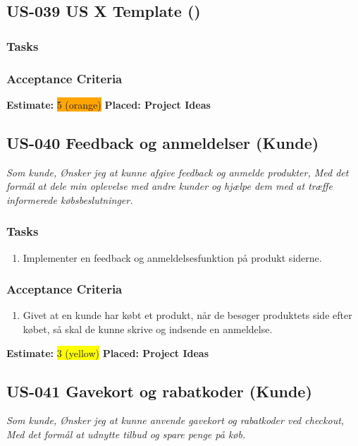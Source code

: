 \subsection{US-039 US X Template ()}
\label{sec:US-039}
\textit{}
\subsubsection*{\textbf{Tasks}}
\begin{enumerate}
\end{enumerate}
\subsubsection*{\textbf{Acceptance Criteria}}
\begin{enumerate}
\end{enumerate}
\textbf{Estimate:} \colorbox{orange}{5 (orange)}
\textbf{Placed: Project Ideas}
\par\noindent\dotfill

\subsection{US-040 Feedback og anmeldelser (Kunde)}
\label{sec:US-040}
\textit{Som kunde, Ønsker jeg at kunne afgive feedback og anmelde produkter, Med det formål at dele min oplevelse med andre kunder og hjælpe dem med at træffe informerede købsbeslutninger.}
\subsubsection*{\textbf{Tasks}}
\begin{enumerate}
  \item Implementer en feedback og anmeldelsesfunktion på produkt siderne.
\end{enumerate}
\subsubsection*{\textbf{Acceptance Criteria}}
\begin{enumerate}
  \item Givet at en kunde har købt et produkt, når de besøger produktets side efter købet, så skal de kunne skrive og indsende en anmeldelse.
\end{enumerate}
\textbf{Estimate:} \colorbox{yellow}{3 (yellow)}
\textbf{Placed: Project Ideas}
\par\noindent\dotfill

\subsection{US-041 Gavekort og rabatkoder (Kunde)}
\label{sec:US-041}
\textit{Som kunde, Ønsker jeg at kunne anvende gavekort og rabatkoder ved checkout, Med det formål at udnytte tilbud og spare penge på køb.}
